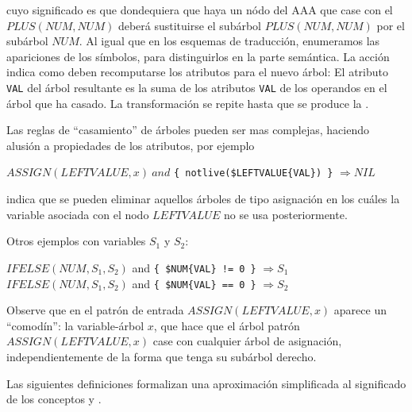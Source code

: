 cuyo significado es que dondequiera que haya un nódo del AAA que case 
con el  $PLUS(NUM, NUM)$ deberá sustituirse
el subárbol $PLUS(NUM, NUM)$ por el subárbol $NUM$. Al igual que en los 
esquemas de traducción, enumeramos las apariciones de los símbolos,
para distinguirlos en la parte semántica. La acción indica 
como deben recomputarse los atributos para el nuevo árbol:
El atributo \verb|VAL| del árbol resultante es la suma de los atributos
\verb|VAL| de los operandos en el árbol que ha casado.
La transformación se repite hasta que se produce la .

Las reglas de ``casamiento''  de árboles pueden ser mas complejas, 
haciendo alusión a propiedades de los atributos, por ejemplo

\vspace{0.25cm}
\begin{center}
$ASSIGN(LEFTVALUE, x)\ and$ \verb|{ notlive($LEFTVALUE{VAL}) }| $\Longrightarrow NIL$
\end{center}
\vspace{0.25cm}

indica que se pueden eliminar aquellos árboles de tipo asignación
en los cuáles la variable asociada con el nodo $LEFTVALUE$
no se usa posteriormente. 

Otros ejemplos con variables $S_1$ y $S_2$:

\begin{center}
$IFELSE(NUM, S_1, S_2)$ and \verb|{ $NUM{VAL} != 0 }| $\Longrightarrow S_1$\\ 
$IFELSE(NUM, S_1, S_2)$ and \verb|{ $NUM{VAL} == 0 }| $\Longrightarrow S_2$ 
\end{center}


%
%

Observe que en el patrón de entrada $ASSIGN(LEFTVALUE, x)$ aparece un
``comodín'': la variable-árbol $x$, que hace que el árbol
patrón $ASSIGN(LEFTVALUE, x)$ case con cualquier árbol de asignación,
independientemente de la forma que tenga su subárbol derecho.

Las siguientes definiciones formalizan una aproximación simplificada 
al significado de los conceptos  y
.

